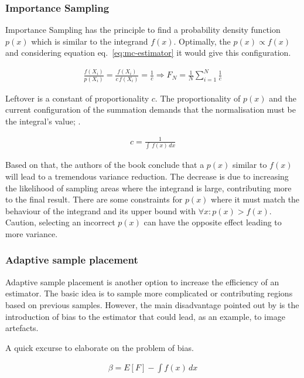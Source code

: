 \subsubsection*{Importance Sampling}

Importance Sampling has the principle to find a probability density function $p(x)$ which is similar to the integrand $f(x)$.
Optimally, the $p(x) \propto f(x)$ and considering equation eq.~\ref{eq:mc-estimator} it would give this configuration.

\begin{align*}
\frac{f(X_i)}{p(X_i)}=\frac{f(X_i)}{c\,f(X_i)}=\frac{1}{c} \Rightarrow F_N=\frac{1}{N}\sum_{i=1}^{N}\frac{1}{c}
\end{align*}

Leftover is a constant of proportionality $c$.
The proportionality of $p(x)$ and the current configuration of the summation demands that the normalisation must be the integral's value; \cite{veach_robust_1997}.

\begin{align*}
c=\frac{1}{\int\,f(x)\,dx}
\end{align*}

Based on that, the authors of the book \cite{kalos_monte_2008} conclude that a $p(x)$ similar to $f(x)$ will lead to a tremendous variance reduction.
The decrease is due to increasing the likelihood of sampling areas where the integrand is large, contributing more to the final result.
There are some constraints for $p(x)$ where it must match the behaviour of the integrand and its upper bound with $\forall x : p(x) > f(x)$.
Caution, selecting an incorrect $p(x)$ can have the opposite effect leading to more variance.

\subsubsection*{Adaptive sample placement}

Adaptive sample placement is another option to increase the efficiency of an estimator.
The basic idea is to sample more complicated or contributing regions based on previous samples.
However, the main disadvantage pointed out by \cite{veach_robust_1997} is the introduction of bias to the estimator that could lead, as an example, to image artefacts.

A quick excurse to elaborate on the problem of bias.

\begin{align*}
\beta = E[F]-\int f(x)\,dx
\end{align*}

